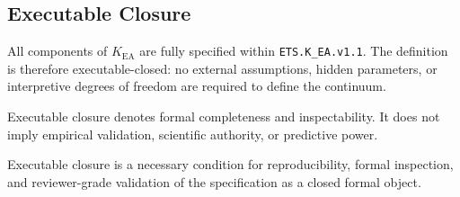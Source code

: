 \subsection{Executable Closure}

All components of $K_{\mathrm{EA}}$ are fully specified within
\texttt{ETS.K\_EA.v1.1}.
The definition is therefore executable-closed: no external assumptions,
hidden parameters, or interpretive degrees of freedom are required to
define the continuum.

Executable closure denotes formal completeness and inspectability.
It does not imply empirical validation, scientific authority, or
predictive power.

Executable closure is a necessary condition for reproducibility,
formal inspection, and reviewer-grade validation of the specification
as a closed formal object.

